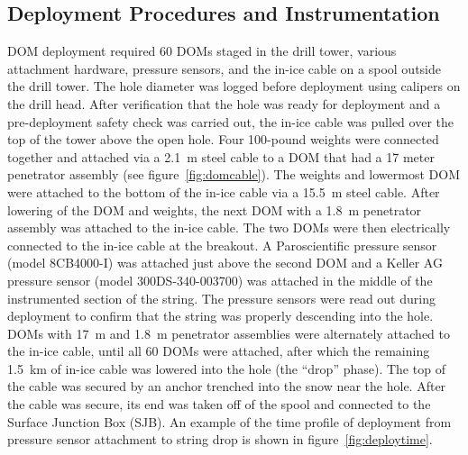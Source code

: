 
\subsection{\label{sec:deployment_inst}Deployment Procedures and Instrumentation}

DOM deployment required 60 DOMs staged in the drill tower, various
attachment hardware, pressure sensors, and the in-ice cable on a spool
outside the drill tower. The hole diameter was logged before deployment
using calipers on the drill head. After verification that the hole was 
ready for deployment and a pre-deployment safety check was carried out, the in-ice cable
was pulled over the top of the tower above the open hole. Four 100-pound
weights were connected together and attached via a 2.1~m steel cable to a
DOM that had a 17 meter penetrator assembly (see figure~\ref{fig:domcable}). The weights and
lowermost DOM were attached to the bottom of the in-ice cable via a 15.5~m
steel cable. After lowering of the DOM and weights, the next DOM with a
1.8~m penetrator assembly was attached to the in-ice cable. The two DOMs were
then electrically connected to the in-ice cable at the breakout. A
Paroscientific pressure sensor (model 8CB4000-I) was attached just above the second DOM
and a Keller AG pressure sensor (model 300DS-340-003700) was attached in the middle of the
instrumented section of the string. The
pressure sensors were read out during deployment to confirm that the string
was properly descending into the hole.   DOMs with 17~m and
1.8~m penetrator assemblies were alternately attached to the in-ice 
cable, until all 60 DOMs were attached, after which the remaining 1.5~km of
in-ice cable was lowered into the hole (the ``drop'' phase). The top of the
cable was secured by an anchor trenched into the snow near the hole. After the
cable was secure, its end was taken off of the spool and connected to the
Surface Junction Box (SJB). An example of the time profile of deployment from pressure sensor
attachment to string drop is shown in figure~\ref{fig:deploytime}.

